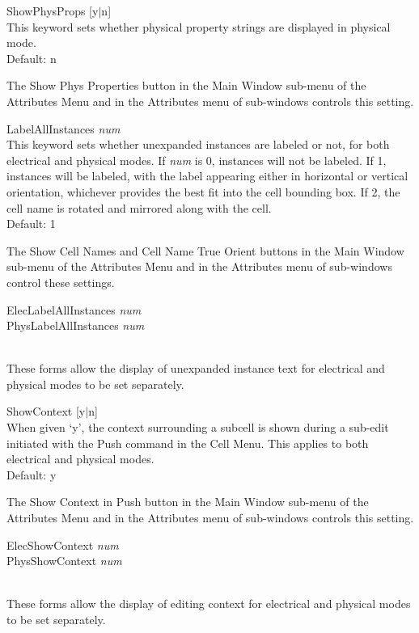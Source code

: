 \begin{description}
\item{\vt ShowPhysProps} [{\vt y}$|${\vt n}]\\
This keyword sets whether physical property strings are displayed
in physical mode.\\
Default: {\vt n}

The {\cb Show Phys Properties} button in the {\cb Main Window} sub-menu
of the {\cb Attributes Menu} and in the {\cb Attributes} menu of
sub-windows controls this setting.

\item{\vt LabelAllInstances} {\it num}\\
This keyword sets whether unexpanded instances are labeled or not, for
both electrical and physical modes.  If {\it num\/} is 0, instances
will not be labeled.  If 1, instances will be labeled, with the label
appearing either in horizontal or vertical orientation, whichever
provides the best fit into the cell bounding box.  If 2, the cell name
is rotated and mirrored along with the cell.\\
Default: 1

The {\cb Show Cell Names} and {\cb Cell Name True Orient} buttons in
the {\cb Main Window} sub-menu of the {\cb Attributes Menu} and in the
{\cb Attributes} menu of sub-windows control these settings.

\item\parbox[b]{4in}{\vt
ElecLabelAllInstances {\it num}\\
PhysLabelAllInstances {\it num}}\\
These forms allow the display of unexpanded instance text for
electrical and physical modes to be set separately.

\item{\vt ShowContext} [{\vt y}$|${\vt n}]\\
When given `{\vt y}', the context surrounding a subcell is shown during
a sub-edit initiated with the {\cb Push} command in the {\cb Cell Menu}.
This applies to both electrical and physical modes.\\
Default: {\vt y}

The {\cb Show Context in Push} button in the {\cb Main Window}
sub-menu of the {\cb Attributes Menu} and in the {\cb Attributes} menu
of sub-windows controls this setting.

\item\parbox[b]{4in}{\vt
ElecShowContext {\it num}\\
PhysShowContext {\it num}}\\
These forms allow the display of editing context for electrical and
physical modes to be set separately.


\end{description}

